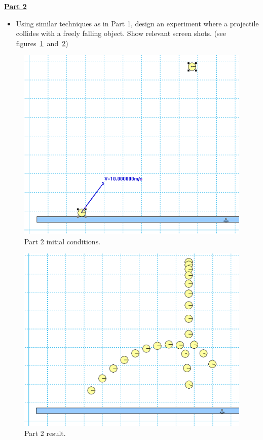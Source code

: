 \documentclass[12pt]{article}
\begin{document}
\underline{\textbf{Part 2}} \par
\begin{itemize}
\item Using similar techniques as in Part 1, design an experiment where a projectile collides with a freely falling object.
Show relevant screen shots. (see figures~\ref{fig:fig2_1}~and~\ref{fig:fig2_2})
\end{itemize}
%
\begin{figure}[!h]
\centering
\includegraphics[scale=0.35]{figures/fig2_1.png}
\caption{Part 2 initial conditions.}
\label{fig:fig2_1}
\end{figure}
%
\begin{figure}[!h]
\centering
\includegraphics[scale=0.35]{figures/fig2_2.png}
\caption{Part 2 result.}
\label{fig:fig2_2}
\end{figure}
\end{document}

